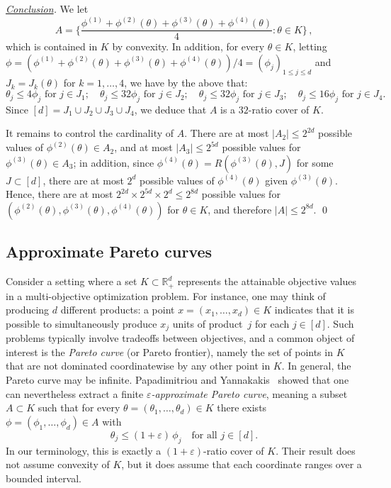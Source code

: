 \documentclass[11pt]{article}
\newcommand{\R}{\mathbb R}
\renewcommand{\leq}{\leqslant}
\renewcommand{\le}{\leqslant}
\newcommand{\eps}{\varepsilon}
\theoremstyle{definition}
\theoremstyle{remark}
\begin{document}
  \emph{\underline{Conclusion}.}
  We let
  \begin{equation*}
    A = \bigg\{ \frac{\phi^{(1)} + \phi^{(2)} (\theta) + \phi^{(3)} (\theta) + \phi^{(4)} (\theta)}{4} : \theta \in K \bigg\}
    \, ,
  \end{equation*}
  which is contained in $K$ by convexity.
  In addition, for every $\theta \in K$, letting $\phi = (\phi^{(1)} + \phi^{(2)} (\theta) + \phi^{(3)} (\theta) + \phi^{(4)} (\theta))/4 = (\phi_j)_{1 \leq j \leq d}$ and $J_k = J_k (\theta)$ for $k=1, \dots, 4$, we have by the above that:
  \begin{equation*}
    \theta_j \leq 4 \phi_j \text{ for } j \in J_1 ; \quad
    \theta_j \leq 32 \phi_j \text{ for } j \in J_2; \quad
    \theta_j \leq 32 \phi_j \text{ for } j \in J_3; \quad
    \theta_j \leq 16 \phi_j \text{ for } j \in J_4 .
  \end{equation*}
  Since $[d] = J_1 \cup J_2 \cup J_3 \cup J_4$, we deduce that $A$ is a $32$-ratio cover of $K$.

  It remains to control the cardinality of $A$.
  There are at most $|A_2| \leq 2^{2d}$ possible values of $\phi^{(2)} (\theta) \in A_2$, and at most $|A_3| \leq 2^{5d}$ possible values for $\phi^{(3)} (\theta) \in A_3$; in addition, since $\phi^{(4)} (\theta) = R(\phi^{(3)} (\theta),J)$ for some $J \subset [d]$, there are at most $2^d$ possible values of $\phi^{(4)} (\theta)$ given $\phi^{(3)} (\theta)$.
  Hence, there are at most $2^{2d} \times 2^{5d} \times 2^d \leq 2^{8 d}$ possible values for $(\phi^{(2)} (\theta), \phi^{(3)} (\theta), \phi^{(4)} (\theta))$ for $\theta \in K$, and therefore $|A| \leq 2^{8d}$. \qed

\subsection{Approximate Pareto curves}\label{subsection:apply-pareto}
Consider a setting where a set $K \subset \R_+^d$ represents the attainable objective values in a multi-objective optimization problem.
For instance, one may think of producing $d$ different products: a point $x=(x_1,\dots,x_d)\in K$ indicates that it is possible to simultaneously produce $x_j$ units of product~$j$ for each $j\in[d]$.
Such problems typically involve tradeoffs between objectives, and a common object of interest is the \emph{Pareto curve} (or Pareto frontier), namely the set of points in $K$ that are not dominated coordinatewise by any other point in $K$. In general, the Pareto curve may be infinite.
Papadimitriou and Yannakakis~\cite{papadimitriou2000approximability} showed that one can nevertheless extract a finite \emph{$\eps$-approximate Pareto curve}, meaning a subset $A\subset K$ such that for every $\theta=(\theta_1,\dots,\theta_d)\in K$ there exists $\phi=(\phi_1,\dots,\phi_d)\in A$ with
\[
\theta_j \le (1+\eps)\,\phi_j\quad\text{for all }j\in[d].
\]
In our terminology, this is exactly a $(1+\eps)$-ratio cover of $K$.
Their result does not assume convexity of $K$, but it does assume that each coordinate ranges over a bounded interval.
\end{document}

